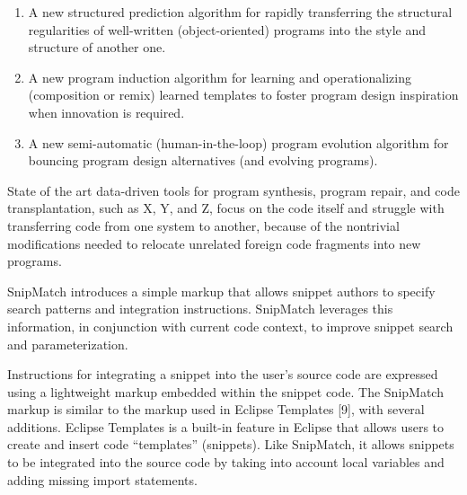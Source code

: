 \begin{enumerate}
	\item A new structured prediction algorithm for rapidly transferring 
	the structural regularities of well-written (object-oriented) programs 
	into the style and structure of another one.
	\item A new program induction algorithm for learning and operationalizing 
	(composition or remix) learned templates to foster program design 
	inspiration when innovation is required.
	\item A new semi-automatic (human-in-the-loop) program evolution algorithm 
	for bouncing program design alternatives (and evolving programs). 
\end{enumerate}

State of the art data-driven tools for program synthesis, program 
repair, and code transplantation, such as X, Y, and Z, focus 
on the code itself and struggle with transferring code from one system 
to another, because of the nontrivial modifications needed to relocate 
unrelated foreign code fragments into new programs. 

SnipMatch introduces a simple markup that allows snippet
authors to specify search patterns and integration instructions.
SnipMatch leverages this information, in conjunction
with current code context, to improve snippet search and
parameterization. 


Instructions for integrating a snippet into the user’s source
code are expressed using a lightweight markup embedded
within the snippet code. The SnipMatch markup is similar
to the markup used in Eclipse Templates [9], with several
additions. Eclipse Templates is a built-in feature in Eclipse
that allows users to create and insert code “templates”
(snippets). Like SnipMatch, it allows snippets to be integrated
into the source code by taking into account local
variables and adding missing import statements. 